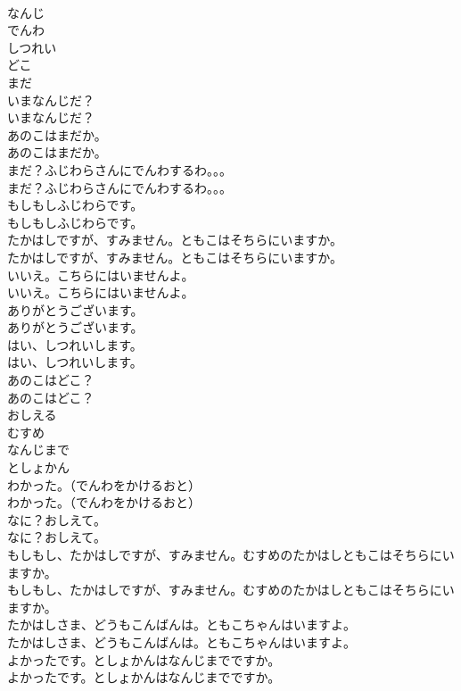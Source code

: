 \documentclass[8pt]{extreport}
\begin{document}
\begin{CJK}{UTF8}{min}
\\	なんじ
\\	でんわ
\\	しつれい
\\	どこ
\\	まだ
\\	いまなんじだ？	
\\	いまなんじだ？ 
\\	あのこはまだか。	
\\	あのこはまだか。 
\\	まだ？ふじわらさんにでんわするわ。。。	
\\	まだ？ふじわらさんにでんわするわ。。。 
\\	もしもしふじわらです。	
\\	もしもしふじわらです。 
\\	たかはしですが、すみません。ともこはそちらにいますか。	
\\	たかはしですが、すみません。ともこはそちらにいますか。 
\\	いいえ。こちらにはいませんよ。	
\\	いいえ。こちらにはいませんよ。 
\\	ありがとうございます。	
\\	ありがとうございます。 
\\	はい、しつれいします。	
\\	はい、しつれいします。 
\\	あのこはどこ？	
\\	あのこはどこ？ 
\\	おしえる
\\	むすめ
\\	なんじまで
\\	としょかん
\\	わかった。（でんわをかけるおと）	
\\	わかった。（でんわをかけるおと） 
\\	なに？おしえて。	
\\	なに？おしえて。 
\\	もしもし、たかはしですが、すみません。むすめのたかはしともこはそちらにいますか。	
\\	もしもし、たかはしですが、すみません。むすめのたかはしともこはそちらにいますか。 
\\	たかはしさま、どうもこんばんは。ともこちゃんはいますよ。	
\\	たかはしさま、どうもこんばんは。ともこちゃんはいますよ。 
\\	よかったです。としょかんはなんじまでですか。	
\\	よかったです。としょかんはなんじまでですか。 

\end{CJK}
\end{document}
